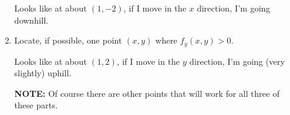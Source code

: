 \documentclass[10pt]{article}
\newenvironment{red}{\color{red}}{\ignorespacesafterend}
\begin{document}
\begin{enumerate}[leftmargin=0pt]
\begin{enumerate}
    \begin{red}
    Looks like at about $(1,-2)$, if I move in the $x$ direction, I'm going downhill.
    \end{red}
    
    \item Locate, if possible, one point $(x,y)$ where $f_y(x,y)>0$.
    
    \begin{red}
    Looks like at about $(1,2)$, if I move in the $y$ direction, I'm going (very slightly) uphill.
    
    \textbf{NOTE:} Of course there are other points that will work for all three of these parts.
    \end{red}

\end{enumerate}

\end{enumerate}
\end{document}
